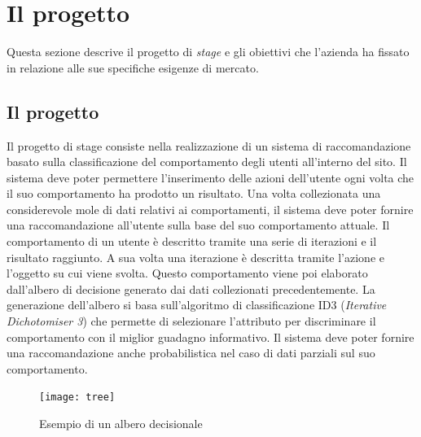 \section{Il progetto}
Questa sezione descrive il progetto di \emph{stage} e gli obiettivi che l'azienda ha fissato in relazione alle sue specifiche esigenze di mercato. 
\subsection{Il progetto}
Il progetto di stage consiste nella realizzazione di un sistema di raccomandazione basato sulla classificazione del comportamento degli utenti all'interno del sito. Il sistema deve poter permettere l'inserimento delle azioni dell'utente ogni volta che il suo comportamento ha prodotto un risultato. Una volta collezionata una considerevole mole di dati relativi ai comportamenti, il sistema deve poter fornire una raccomandazione all'utente sulla base del suo comportamento attuale. Il comportamento di un utente è descritto tramite una serie di iterazioni e il risultato raggiunto. A sua volta una iterazione è descritta tramite l'azione e l'oggetto su cui viene svolta. Questo comportamento viene poi elaborato dall'albero di decisione generato dai dati collezionati precedentemente. La generazione dell'albero si basa sull'algoritmo di classificazione ID3 (\emph{Iterative Dichotomiser 3}) che permette di selezionare l'attributo per discriminare il comportamento con il miglior guadagno informativo. Il sistema deve poter fornire una raccomandazione anche probabilistica nel caso di dati parziali sul suo comportamento.
\begin{figure}[ht]
\centering
\texttt{[image: tree]}
\caption{Esempio di un albero decisionale}
\end{figure}
